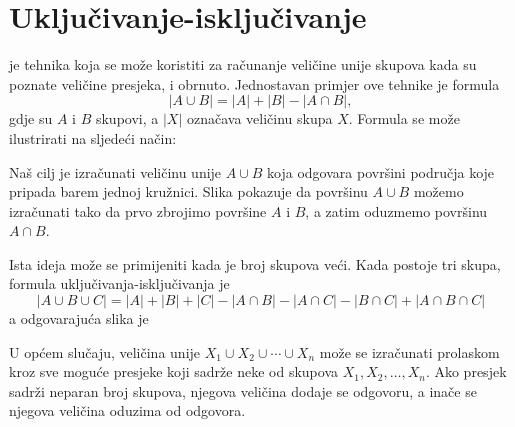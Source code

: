 \section{Uključivanje-isključivanje}


 je tehnika
koja se može koristiti za računanje veličine
unije skupova kada su poznate veličine
presjeka, i obrnuto.
Jednostavan primjer ove tehnike je formula
\[ |A \cup B| = |A| + |B| - |A \cap B|,\]
gdje su $A$ i $B$ skupovi, a $|X|$
označava veličinu skupa $X$.
Formula se može ilustrirati na sljedeći način:

\begin{center}
\end{center}

Naš cilj je izračunati
veličinu unije $A \cup B$
koja odgovara površini područja
koje pripada barem jednoj kružnici.
Slika pokazuje da površinu
$A \cup B$ možemo izračunati tako da prvo zbrojimo
površine $A$ i $B$, a zatim oduzmemo
površinu $A \cap B$.

Ista ideja može se primijeniti kada je broj
skupova veći.
Kada postoje tri skupa, formula uključivanja-isključivanja je
\[ |A \cup B \cup C| = |A| + |B| + |C| - |A \cap B|  - |A \cap C|  - |B \cap C| + |A \cap B \cap C| \]
a odgovarajuća slika je

\begin{center}
\end{center}

U općem slučaju, veličina
unije $X_1 \cup X_2 \cup \cdots \cup X_n$
može se izračunati prolaskom kroz sve moguće
presjeke koji sadrže neke od skupova $X_1,X_2,\ldots,X_n$.
Ako presjek sadrži neparan broj skupova,
njegova veličina dodaje se odgovoru,
a inače se njegova veličina oduzima od odgovora.

